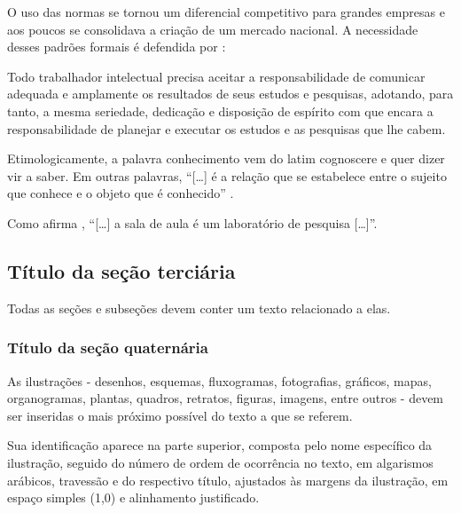 O uso das normas se tornou um diferencial competitivo para grandes empresas e aos poucos se consolidava a criação de um mercado nacional. A necessidade desses padrões formais é defendida por :

\begin{SingleSpace}
    \begin{flushright}
        \begin{minipage}[b]{12cm}
            \begin{small}
                Todo trabalhador intelectual precisa aceitar a responsabilidade de comunicar adequada e amplamente os resultados de seus estudos e pesquisas, adotando, para tanto, a mesma seriedade, dedicação e disposição de espírito com que encara a responsabilidade de planejar e executar os estudos e as pesquisas que lhe cabem.
            \end{small}
        \end{minipage}
    \end{flushright}
\end{SingleSpace}

Etimologicamente, a palavra conhecimento vem do latim cognoscere e quer dizer vir a saber. Em outras palavras, ``[…] é a relação que se estabelece entre o sujeito que conhece e o objeto que é conhecido'' \cite[p. 5]{cervo}.

Como afirma , ``[…] a sala de aula é um laboratório de pesquisa […]''.

\subsection{Título da seção terciária}

Todas as seções e subseções devem conter um texto relacionado a elas.

\subsubsection{Título da seção quaternária}

As ilustrações - desenhos, esquemas, fluxogramas, fotografias, gráficos, mapas, organogramas, plantas, quadros, retratos, figuras, imagens, entre outros - devem ser inseridas o mais próximo possível do texto a que se referem.

Sua identificação aparece na parte superior, composta pelo nome específico da ilustração, seguido do número de ordem de ocorrência no texto, em algarismos arábicos, travessão e do respectivo título, ajustados às margens da ilustração, em espaço simples (1,0) e alinhamento justificado.

